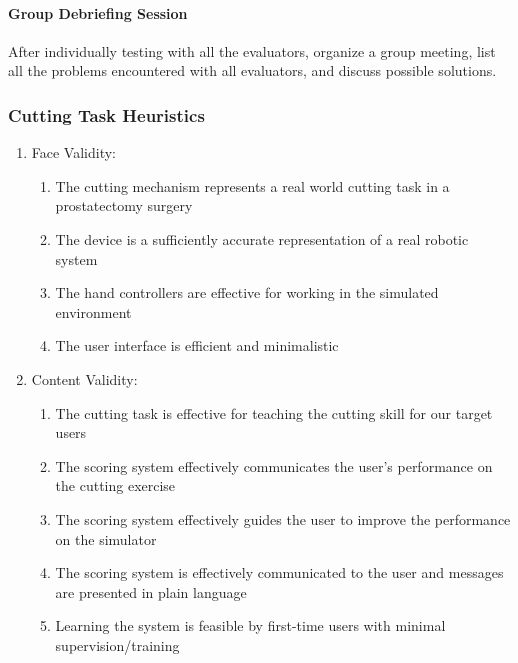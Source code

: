 \paragraph{Group Debriefing Session}
After individually testing with all the evaluators, organize a group meeting, list all the problems encountered with all evaluators, and discuss possible solutions.

\subsubsection{Cutting Task Heuristics}
\begin{enumerate}[1.]
  \item Face Validity:
	\begin{enumerate}[\em a\em)]
	  \item The cutting mechanism represents a real world cutting task in a prostatectomy surgery
	  \item The device is a sufficiently accurate representation of a real robotic system
	  \item The hand controllers are effective for working in the simulated environment
	  \item The user interface is efficient and minimalistic
	\end{enumerate}

  \item Content Validity:
	\begin{enumerate}[\em a\em)]
	  \item The cutting task is effective for teaching the cutting skill for our target users
	  \item The scoring system effectively communicates the user's performance on the cutting exercise
	  \item The scoring system effectively guides the user to improve the performance on the simulator
	  \item The scoring system is effectively communicated to the user and messages are presented in plain language
	  \item Learning the system is feasible by first-time users with minimal supervision/training
	\end{enumerate}


\end{enumerate}
